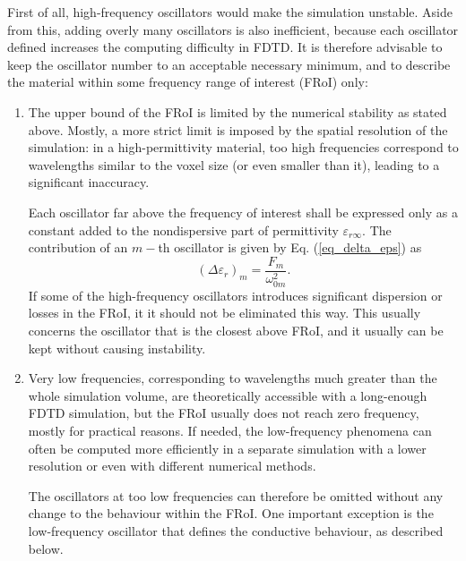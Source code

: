 First of all, high-frequency oscillators would make the simulation unstable.
Aside from this, adding overly many oscillators is also inefficient, because each oscillator defined increases the computing difficulty in FDTD. 
It is therefore advisable to keep the oscillator number to an acceptable necessary minimum, and to describe the material within some frequency range of interest (FRoI) %
only:
\begin{enumerate}
 \item{
The upper bound of the FRoI is limited by the numerical stability as stated above. Mostly, a more strict limit is imposed by the spatial resolution of the simulation: in a high-permittivity material, too high frequencies correspond to wavelengths similar to the voxel size (or even smaller than it), leading to a significant inaccuracy. 

Each oscillator far above the frequency of interest shall be expressed only as a constant added to the nondispersive part of permittivity $\varepsilon_{r\infty}$. The contribution of an $m-$th oscillator is given by Eq. (\ref{eq_delta_eps}) as 
$$(\Delta \varepsilon_r)_m = \frac{F_m}{\omega_{0m}^2}.$$ 
If some of the high-frequency oscillators introduces significant dispersion or losses in the FRoI, it it should not be eliminated this way. This usually concerns the oscillator that is the closest above FRoI, and it usually can be kept without causing instability.
} 
 \item{
Very low frequencies, corresponding to wavelengths much greater than the whole simulation volume, are theoretically accessible with a long-enough FDTD simulation, but the FRoI usually does not reach zero frequency, mostly for practical reasons. If needed, the low-frequency phenomena can often be computed more efficiently in a separate simulation with a lower resolution or even with different numerical methods.

The oscillators at too low frequencies can therefore be omitted without any change to the behaviour within the FRoI. One important exception is the low-frequency oscillator that defines the conductive behaviour, as described below.
} 
 \end{enumerate}
